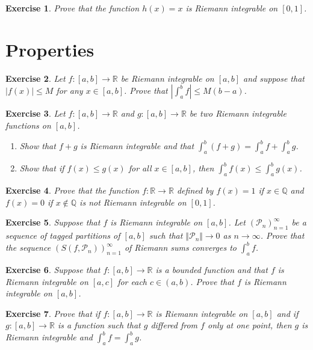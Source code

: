 \documentclass[12pt]{article}
\newcommand{\bR}{\mathbb{R}}
\newcommand{\bQ}{\mathbb{Q}}
\newcommand{\cP}{\mathcal{P}}
\newcommand{\ra}{\rightarrow}
\theoremstyle{plain}
\newtheorem{exer}{\textbf{Exercise}}}
\theoremstyle{plain}
\theoremstyle{plain}
\theoremstyle{plain}
\begin{document}
\begin{exer}
Prove that the function $h(x) = x$ is Riemann integrable on $[0, 1]$.
\end{exer}

\section{Properties}
\begin{exer}
Let $f : [a, b] \ra \bR$ be Riemann integrable on $[a, b]$ and suppose that $|f(x)| \leq M$ for any $x \in [a, b]$. Prove that $| \int_a^b f | \leq M (b-a)$.
\end{exer}

\begin{exer}
Let $f : [a, b] \ra \bR$ and $g : [a, b] \ra \bR$ be two Riemann integrable functions on $[a, b]$.
	\begin{enumerate}[label=\textbf{\alph*)}]
	\item Show that $f + g$ is Riemann integrable and that $\int_a^b (f + g) = \int_a^b f + \int_a^b g$.
	\item Show that if $f(x) \leq g(x)$ for all $x \in [a, b]$, then $\int_a^b f(x) \leq \int_a^b g(x)$.
	\end{enumerate}
\end{exer}

\begin{exer}
Prove that the function $f : \bR \ra \bR$ defined by $f(x) = 1$ if $x \in \bQ$ and $f(x) = 0$ if $x \not\in \bQ$ is not Riemann integrable on $[0, 1]$.
\end{exer}

\begin{exer}
Suppose that $f$ is Riemann integrable on $[a, b]$. Let $(\cP_n )_{n = 1}^\infty$ be a sequence of tagged partitions of $[a, b]$ such that $\Vert \cP_n \Vert \ra 0$ as $n \ra \infty$. Prove that the sequence $(S(f, \cP_n ))_{n = 1}^\infty$ of Riemann sums converges to $\int_a^b f$.
\end{exer}

\begin{exer}
Suppose that $f : [a, b] \ra \bR$ is a bounded function and that $f$ is Riemann integrable on $[a, c]$ for each $c \in (a, b)$. Prove that $f$ is Riemann integrable on $[a, b]$.
\end{exer}

\begin{exer}
Prove that if $f : [a, b] \ra \bR$ is Riemann integrable on $[a, b]$ and if $g : [a, b ] \ra \bR$ is a function such that $g$ differed from $f$ only at one point, then $g$ is Riemann integrable and $\int_a^b f = \int_a^b g$. 
\end{exer}
\end{document}
